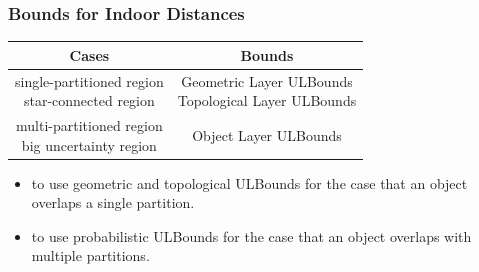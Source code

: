 
\begin{frame}
\frametitle{Bounds for Indoor Distances}

\centering
\begin{tabular}{|c|c|}
\hline
\textbf{Cases} & Bounds \\
\hline
\tabincell{c}{single-partitioned region \\ star-connected region} & \tabincell{c}{Geometric Layer ULBounds \\ Topological Layer ULBounds} \\
\hline
\tabincell{c}{multi-partitioned region \\ big uncertainty region} & Object Layer ULBounds \\
\hline
\end{tabular}

\begin{itemize}
  \item to use geometric and topological ULBounds for the case that an object overlaps a single partition.
  \item to use probabilistic ULBounds for the case that an object overlaps with multiple partitions.
\end{itemize}

\end{frame}


